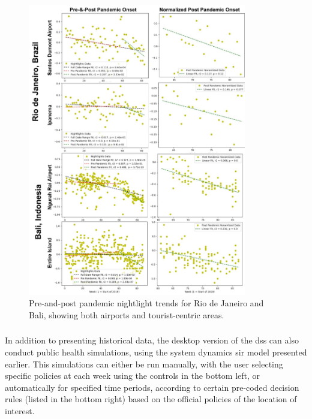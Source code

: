 \newpage

\begin{figure}[H] 
\centering
\includegraphics[width=0.85\textwidth]{Figures/chap5/Nightlights_Graphs.png}
\caption[Nightlight Trends for Rio de Janeiro and Bali]{Pre-and-post pandemic nightlight trends for Rio de Janeiro and Bali, showing both airports and tourist-centric areas.}
\label{fig:nlg}
\end{figure}



\subsubsection{}

In addition to presenting historical data, the desktop version of the \ac{dss} can also conduct public health simulations, using the system dynamics \ac{sir} model presented earlier. This simulations can either be run manually, with the user selecting specific policies at each week using the controls in the bottom left, or automatically for specified time periods, according to certain pre-coded decision rules (listed in the bottom right) based on the official policies of the location of interest.

